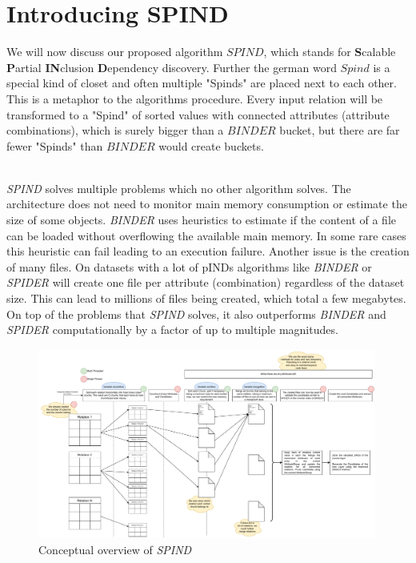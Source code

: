\section{Introducing SPIND}

We will now discuss our proposed algorithm $SPIND$, which stands for \textbf{S}calable \textbf{P}artial \textbf{IN}clusion \textbf{D}ependency discovery. Further the german word $Spind$ is a special kind of closet and often multiple "Spinds" are placed next to each other. This is a metaphor to the algorithms procedure. Every input relation will be transformed to a "Spind" of sorted values with connected attributes (attribute combinations), which is surely bigger than a $BINDER$ bucket, but there are far fewer "Spinds" than $BINDER$ would create buckets.

\noindent \\ \textit{SPIND} solves multiple problems which no other algorithm solves. The architecture does not need to monitor main memory consumption or estimate the size of some objects. \textit{BINDER} uses heuristics to estimate if the content of a file can be loaded without overflowing the available main memory. In some rare cases this heuristic can fail leading to an execution failure. Another issue is the creation of many files. On datasets with a lot of pINDs algorithms like \textit{BINDER} or \textit{SPIDER} will create one file per attribute (combination) regardless of the dataset size. This can lead to millions of files being created, which total a few megabytes. On top of the problems that \textit{SPIND} solves, it also outperforms \textit{BINDER} and \textit{SPIDER} computationally by a factor of up to multiple magnitudes.

\begin{figure}[h]
    \centering
    \includegraphics[width=0.99\textwidth]{files/SPIND.pdf}
    \caption{Conceptual overview of \textit{SPIND}}
    \label{fig:spind}
\end{figure}

